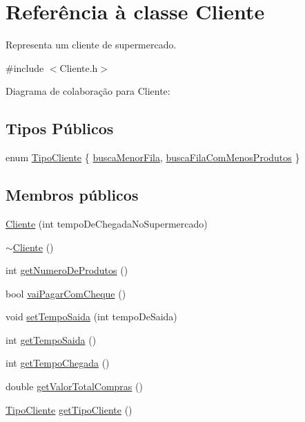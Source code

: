 \hypertarget{a00002}{\section{Referência à classe Cliente}
\label{a00002}
}


Representa um cliente de supermercado.  




{\ttfamily \#include $<$Cliente.\+h$>$}



Diagrama de colaboração para Cliente\+:
\subsection*{Tipos Públicos}
\begin{DoxyCompactItemize}
\item 
enum \hyperlink{a00002_a8a3be2b4ce63f1f0c04d6ae5a71db657}{Tipo\+Cliente} \{ \hyperlink{a00002_a8a3be2b4ce63f1f0c04d6ae5a71db657aaf1391199882e9e29292e6b7b2ff2b91}{busca\+Menor\+Fila}, 
\hyperlink{a00002_a8a3be2b4ce63f1f0c04d6ae5a71db657a0e7a8fbf97e475f4fb92a09650c933e0}{busca\+Fila\+Com\+Menos\+Produtos}
 \}
\end{DoxyCompactItemize}
\subsection*{Membros públicos}
\begin{DoxyCompactItemize}
\item 
\hyperlink{a00002_a6625b6a833a0e8b2f7959bc5344eb0be}{Cliente} (int tempo\+De\+Chegada\+No\+Supermercado)
\item 
\hyperlink{a00002_a29d1d53394350c66363109e33c990b58}{$\sim$\+Cliente} ()
\item 
int \hyperlink{a00002_a756b8f00c253d491b8a4cabaa3c1540b}{get\+Numero\+De\+Produtos} ()
\item 
bool \hyperlink{a00002_ac2d3ce2f3bd1871c050ed882465d77aa}{vai\+Pagar\+Com\+Cheque} ()
\item 
void \hyperlink{a00002_a5a7d3685690926672a511a169e47e19e}{set\+Tempo\+Saida} (int tempo\+De\+Saida)
\item 
int \hyperlink{a00002_a43682e1d4ace198e91aa7072955a0fe0}{get\+Tempo\+Saida} ()
\item 
int \hyperlink{a00002_a00cb6606f92e0a5e74d95ce86c66b367}{get\+Tempo\+Chegada} ()
\item 
double \hyperlink{a00002_a90c7cecbe137527735fb4a90008ad0d3}{get\+Valor\+Total\+Compras} ()
\item 
\hyperlink{a00002_a8a3be2b4ce63f1f0c04d6ae5a71db657}{Tipo\+Cliente} \hyperlink{a00002_abab02599bfed5285df6fd043acec0b5b}{get\+Tipo\+Cliente} ()
\end{DoxyCompactItemize}


